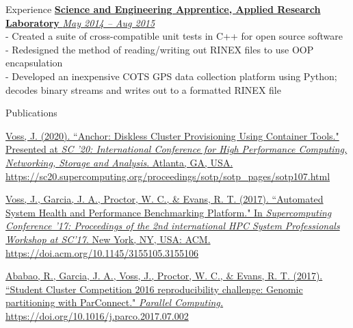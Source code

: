 \documentclass{resume} %
\begin{document}
\begin{rSection}{Experience}
\href{http://arlut.utexas.edu}
{\textbf{Science and Engineering Apprentice, Applied Research Laboratory}
  \hfill{\em May 2014 -- Aug 2015}}
\\- Created a suite of cross-compatible unit tests in C++ for open source software
\\- Redesigned the method of reading/writing out RINEX files to use OOP encapsulation
\\- Developed an inexpensive COTS GPS data collection platform using Python; decodes binary streams and writes out to a formatted RINEX file

\end{rSection}

\begin{rSection}{Publications}

\href{https://sc20.supercomputing.org/proceedings/sotp/sotp_pages/sotp107.html}
{\underline{Voss, J.} (2020). ``Anchor: Diskless Cluster Provisioning Using
Container Tools."
Presented at \textit{SC '20: International Conference for High Performance Computing,
Networking, Storage and Analysis}. Atlanta, GA, USA. \linebreak
https://sc20.supercomputing.org/proceedings/sotp/sotp_pages/sotp107.html}

\href{http://doi.acm.org/10.1145/3155105.3155106}
{\underline{Voss, J.}, Garcia, J. A., Proctor, W. C., \& Evans, R. T.
(2017). ``Automated System Health and Performance Benchmarking Platform."
In \textit{Supercomputing Conference '17: Proceedings of the 2nd international
HPC System Professionals Workshop at SC'17}. New York, NY, USA: ACM.
https://doi.acm.org/10.1145/3155105.3155106}

\href{https://doi.org/10.1016/j.parco.2017.07.002}
{Ababao, R., Garcia, J. A., \underline{Voss, J.}, Proctor, W. C., \& Evans, R.
T. (2017). ``Student Cluster \linebreak Competition 2016 reproducibility challenge: Genomic
partitioning with ParConnect." \textit{Parallel Computing.} \linebreak https://doi.org/10.1016/j.parco.2017.07.002}

\end{rSection}

%
%
%
\end{document}
